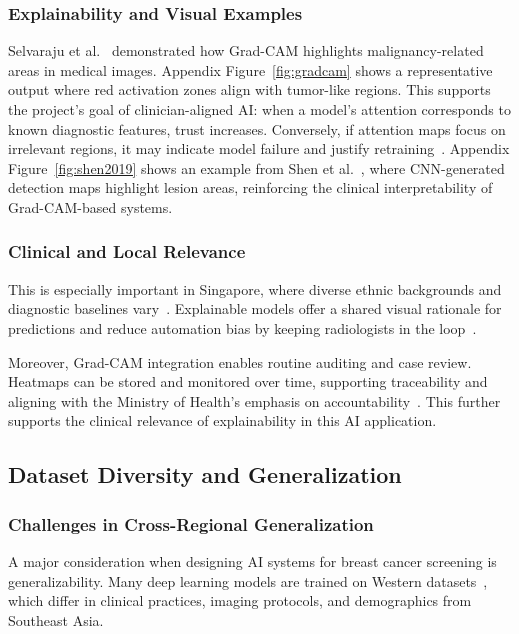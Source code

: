 \documentclass[12pt]{article}
\begin{document}
\subsubsection{Explainability and Visual Examples}

Selvaraju et al.~\cite{5} demonstrated how Grad-CAM highlights malignancy-related areas in medical images. Appendix Figure~\ref{fig:gradcam} shows a representative output where red activation zones align with tumor-like regions. This supports the project’s goal of clinician-aligned AI: when a model’s attention corresponds to known diagnostic features, trust increases. Conversely, if attention maps focus on irrelevant regions, it may indicate model failure and justify retraining~\cite{5}. Appendix Figure~\ref{fig:shen2019} shows an example from Shen et al.~\cite{7}, where CNN-generated detection maps highlight lesion areas, reinforcing the clinical interpretability of Grad-CAM-based systems.

\subsubsection{Clinical and Local Relevance}

This is especially important in Singapore, where diverse ethnic backgrounds and diagnostic baselines vary~\cite{6}. Explainable models offer a shared visual rationale for predictions and reduce automation bias by keeping radiologists in the loop~\cite{3}.

Moreover, Grad-CAM integration enables routine auditing and case review. Heatmaps can be stored and monitored over time, supporting traceability and aligning with the Ministry of Health’s emphasis on accountability~\cite{6}. This further supports the clinical relevance of explainability in this AI application.


\subsection{Dataset Diversity and Generalization}

\subsubsection{Challenges in Cross-Regional Generalization}

A major consideration when designing AI systems for breast cancer screening is generalizability. Many deep learning models are trained on Western datasets~\cite{1}, which differ in clinical practices, imaging protocols, and demographics from Southeast Asia.
\end{document}
